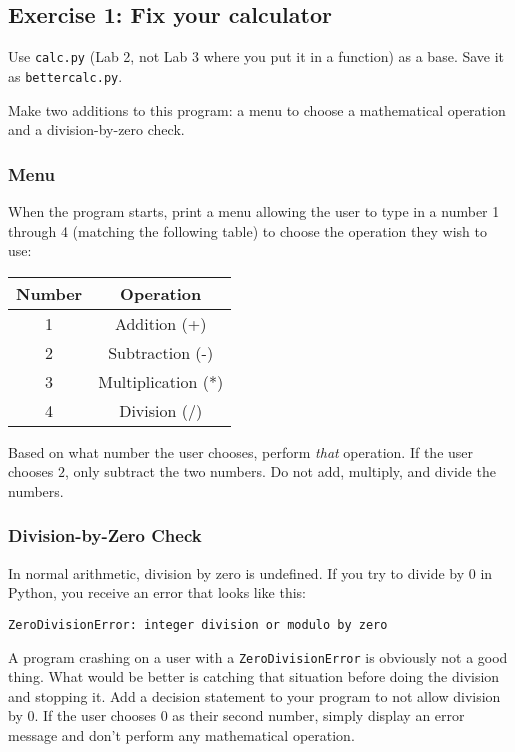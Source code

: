 \documentclass[11pt, letterpaper]{article}
\begin{document}
\subsection*{Exercise 1: Fix your calculator}

Use {\tt calc.py} (Lab 2, not Lab 3 where you put it in a function) as a base. Save it as {\tt bettercalc.py}.

Make two additions to this program: a menu to choose a mathematical operation and a division-by-zero check.

\subsubsection*{Menu}

When the program starts, print a menu allowing the user to type in a number 1 through 4 (matching the following table) to choose the operation they wish to use:\vspace{0.25cm}

\begin{tabular}{|c|c|}
	\hline
	{\bf Number} & {\bf Operation}\\
	\hline
	1 & Addition (+)\\
	2 & Subtraction (-)\\
	3 & Multiplication (*)\\
	4 & Division (/)\\
	\hline
\end{tabular}

Based on what number the user chooses, perform {\em that} operation. If the user chooses $2$, only subtract the two numbers. Do not add, multiply, and divide the numbers.

\subsubsection*{Division-by-Zero Check}

In normal arithmetic, division by zero is undefined. If you try to divide by $0$ in Python, you receive an error that looks like this:

\begin{lstlisting}
ZeroDivisionError: integer division or modulo by zero
\end{lstlisting}

A program crashing on a user with a {\tt ZeroDivisionError} is obviously not a good thing. What would be better is catching that situation before doing the division and stopping it. Add a decision statement to your program to not allow division by $0$. If the user chooses $0$ as their second number, simply display an error message and don't perform any mathematical operation.
\end{document}
